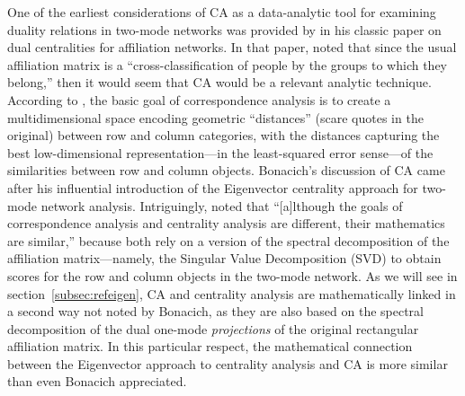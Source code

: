 \documentclass[a4paper,fleqn]{cas-sc}
\begin{document}
One of the earliest considerations of CA as a data-analytic tool for examining duality relations in two-mode networks was provided by \citet[163-165]{bonacich1991simultaneous} in his classic paper on dual centralities for affiliation networks. In that paper, \citet{bonacich1991simultaneous} noted that since the usual affiliation matrix is a ``cross-classification of people by the groups to which they belong,'' then it would seem that CA would be a relevant analytic technique. According to \citet{bonacich1991simultaneous}, the basic goal of correspondence analysis is to create a multidimensional space encoding geometric ``distances'' (scare quotes in the original) between row and column categories, with the distances capturing the best low-dimensional representation---in the least-squared error sense---of the similarities between row and column objects.  Bonacich's discussion of CA came after his influential introduction of the Eigenvector centrality approach for two-mode network analysis. Intriguingly, \citet[163]{bonacich1991simultaneous} noted that ``[a]lthough the goals of correspondence analysis and centrality analysis are different, their mathematics are similar,'' because both rely on a version of the spectral decomposition of the affiliation matrix---namely, the Singular Value Decomposition (SVD) to obtain scores for the row and column objects in the two-mode network. As we will see in section~\ref{subsec:refeigen}, CA and centrality analysis are mathematically linked in a second way not noted by Bonacich, as they are also based on the spectral decomposition of the dual one-mode \textit{projections} of the original rectangular affiliation matrix. In this particular respect, the mathematical connection between the Eigenvector approach to centrality analysis and CA is more similar than even Bonacich appreciated. 
\end{document}
